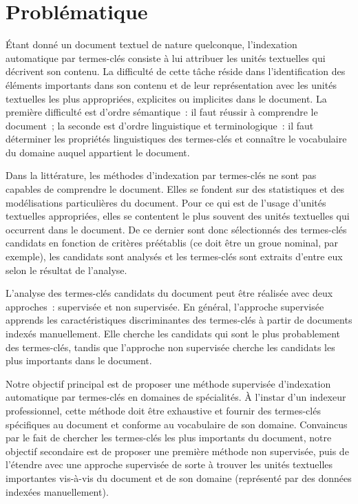 
  \section{Problématique}
  \label{sec:main-introduction-problem_statement}
    Étant donné un document textuel de nature quelconque, l'indexation
    automatique par termes-clés consiste à lui attribuer les unités textuelles
    qui décrivent son contenu. La difficulté de cette tâche réside dans
    l'identification des éléments importants dans son contenu et de leur
    représentation avec les unités textuelles les plus appropriées, explicites
    ou implicites dans le document. La première difficulté est d'ordre
    sémantique~: il faut réussir à comprendre le document~; la seconde est
    d'ordre linguistique et terminologique~: il faut déterminer les propriétés
    linguistiques des termes-clés et connaître le vocabulaire du domaine auquel
    appartient le document.

    Dans la littérature, les méthodes d'indexation par termes-clés ne sont pas
    capables de comprendre le document. Elles se fondent sur des statistiques et
    des modélisations particulières du document. Pour ce qui est de l'usage
    d'unités textuelles appropriées, elles se contentent le plus souvent des
    unités textuelles qui occurrent dans le document. De ce dernier sont donc
    sélectionnés des termes-clés candidats en fonction de critères préétablis
    (ce doit être un groue nominal, par exemple), les candidats sont analysés et
    les termes-clés sont extraits d'entre eux selon le résultat de l'analyse.

    L'analyse des termes-clés candidats du document peut être réalisée avec deux
    approches~: supervisée et non supervisée. En général, l'approche supervisée
    apprends les caractéristiques discriminantes des termes-clés à partir de
    documents indexés manuellement. Elle cherche les candidats qui sont le plus
    probablement des termes-clés, tandis que l'approche non supervisée cherche
    les candidats les plus importants dans le document.

    Notre objectif principal est de proposer une méthode supervisée d'indexation
    automatique par termes-clés en domaines de spécialités. À l'instar d'un
    indexeur professionnel, cette méthode doit être exhaustive et fournir des
    termes-clés spécifiques au document et conforme au vocabulaire de son
    domaine. Convaincus par le fait de chercher les termes-clés les plus
    importants du document, notre objectif secondaire est de proposer une
    première méthode non supervisée, puis de l'étendre avec une approche
    supervisée de sorte à trouver les unités textuelles importantes vis-à-vis du
    document et de son domaine (représenté par des données indexées
    manuellement).

